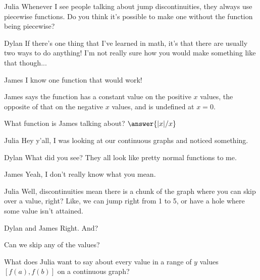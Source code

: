 \documentclass{ximera}
\begin{document}
\begin{dialogue}
\item[Julia] Whenever I see people talking about jump discontinuities, they always use piecewise functions. Do you think it's possible to make one without the function being piecewise?
\item[Dylan] If there's one thing that I've learned in math, it's that there are usually two ways to do anything! I'm not really sure how you would make something like that though...
\item[James] I know one function that would work!
\end{dialogue}

\begin{question}
\begin{hint}
James says the function has a constant value on the positive $x$ values, the opposite of that on the negative $x$ values, and is undefined at $x=0$.
\end{hint}
What function is James talking about?
$\answer{|x|/x}$
\end{question}

\begin{dialogue}
\item[Julia] Hey y'all, I was looking at our continuous graphs and noticed something.
\item[Dylan] What did you see? They all look like pretty normal functions to me.
\item[James] Yeah, I don't really know what you mean.
\item[Julia] Well, discontinuities mean there is a chunk of the graph where you can skip over a value, right? Like, we can jump right from 1 to 5, or have a hole where some value isn't attained.
\item[Dylan and James] Right. And?
\end{dialogue}

\begin{question}
\begin{hint}
Can we skip any of the values?
\end{hint}
What does Julia want to say about every value in a range of $y$ values $[f(a),f(b)]$ on a continuous graph?
\begin{multipleChoice}
\end{multipleChoice}
\end{question}
\end{document}
